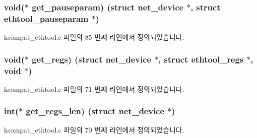 \subsubsection[{\texorpdfstring{get\+\_\+pauseparam}{get_pauseparam}}]{\setlength{\rightskip}{0pt plus 5cm}void($\ast$ get\+\_\+pauseparam) (struct net\+\_\+device $\ast$, struct {\bf ethtool\+\_\+pauseparam} $\ast$)}\hypertarget{struct__kc__ethtool__ops_a266d14b370d8696d91e56070a02f802c}{}\label{struct__kc__ethtool__ops_a266d14b370d8696d91e56070a02f802c}


kcompat\+\_\+ethtool.\+c 파일의 85 번째 라인에서 정의되었습니다.

\subsubsection[{\texorpdfstring{get\+\_\+regs}{get_regs}}]{\setlength{\rightskip}{0pt plus 5cm}void($\ast$ get\+\_\+regs) (struct net\+\_\+device $\ast$, struct {\bf ethtool\+\_\+regs} $\ast$, void $\ast$)}\hypertarget{struct__kc__ethtool__ops_ad3f1b72e923b9bb0d326e4665053ba5a}{}\label{struct__kc__ethtool__ops_ad3f1b72e923b9bb0d326e4665053ba5a}


kcompat\+\_\+ethtool.\+c 파일의 71 번째 라인에서 정의되었습니다.

\subsubsection[{\texorpdfstring{get\+\_\+regs\+\_\+len}{get_regs_len}}]{\setlength{\rightskip}{0pt plus 5cm}int($\ast$ get\+\_\+regs\+\_\+len) (struct net\+\_\+device $\ast$)}\hypertarget{struct__kc__ethtool__ops_af5f39c7c9ccc575243f3dd7bff40254c}{}\label{struct__kc__ethtool__ops_af5f39c7c9ccc575243f3dd7bff40254c}


kcompat\+\_\+ethtool.\+c 파일의 70 번째 라인에서 정의되었습니다.

